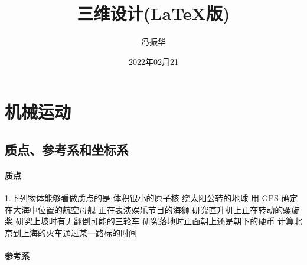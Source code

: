 \documentclass[a4paper,fontset = windows]{ctexbook} %
\begin{document}
\title{\Huge 三维设计(\LaTeX{}版)}
\author{冯振华}
\date{2022年02月21}

\maketitle


\chapter{机械运动}

\section{质点、参考系和坐标系}

\subsubsection{质点}

\begin{jisuan}
   1.下列物体能够看做质点的是
   \qitem 体积很小的原子核
   \qitem 绕太阳公转的地球
   \qitem 用 GPS 确定在大海中位置的航空母舰
   \qitem 正在表演娱乐节目的海狮
   \qitem 研究直升机上正在转动的螺旋桨
   \qitem 研究上坡时有无翻倒可能的三轮车
   \qitem 研究落地时正面朝上还是朝下的硬币
   \qitem 计算北京到上海的火车通过某一路标的时间
\end{jisuan}

\subsubsection{参考系}
\end{document}
